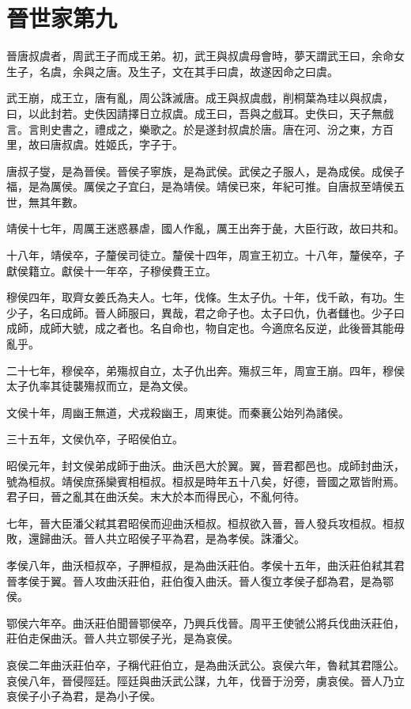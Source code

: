 \chapter{晉世家第九}

晉唐叔虞者，周武王子而成王弟。初，武王與叔虞母會時，夢天謂武王曰，余命女生子，名虞，余與之唐。及生子，文在其手曰虞，故遂因命之曰虞。

武王崩，成王立，唐有亂，周公誅滅唐。成王與叔虞戲，削桐葉為珪以與叔虞，曰，以此封若。史佚因請擇日立叔虞。成王曰，吾與之戲耳。史佚曰，天子無戲言。言則史書之，禮成之，樂歌之。於是遂封叔虞於唐。唐在河、汾之東，方百里，故曰唐叔虞。姓姬氏，字子于。

唐叔子燮，是為晉侯。晉侯子寧族，是為武侯。武侯之子服人，是為成侯。成侯子福，是為厲侯。厲侯之子宜臼，是為靖侯。靖侯已來，年紀可推。自唐叔至靖侯五世，無其年數。

靖侯十七年，周厲王迷惑暴虐，國人作亂，厲王出奔于彘，大臣行政，故曰共和。

十八年，靖侯卒，子釐侯司徒立。釐侯十四年，周宣王初立。十八年，釐侯卒，子獻侯籍立。獻侯十一年卒，子穆侯費王立。

穆侯四年，取齊女姜氏為夫人。七年，伐條。生太子仇。十年，伐千畝，有功。生少子，名曰成師。晉人師服曰，異哉，君之命子也。太子曰仇，仇者讎也。少子曰成師，成師大號，成之者也。名自命也，物自定也。今適庶名反逆，此後晉其能毋亂乎。

二十七年，穆侯卒，弟殤叔自立，太子仇出奔。殤叔三年，周宣王崩。四年，穆侯太子仇率其徒襲殤叔而立，是為文侯。

文侯十年，周幽王無道，犬戎殺幽王，周東徙。而秦襄公始列為諸侯。

三十五年，文侯仇卒，子昭侯伯立。

昭侯元年，封文侯弟成師于曲沃。曲沃邑大於翼。翼，晉君都邑也。成師封曲沃，號為桓叔。靖侯庶孫欒賓相桓叔。桓叔是時年五十八矣，好德，晉國之眾皆附焉。君子曰，晉之亂其在曲沃矣。末大於本而得民心，不亂何待。

七年，晉大臣潘父弒其君昭侯而迎曲沃桓叔。桓叔欲入晉，晉人發兵攻桓叔。桓叔敗，還歸曲沃。晉人共立昭侯子平為君，是為孝侯。誅潘父。

孝侯八年，曲沃桓叔卒，子胛桓叔，是為曲沃莊伯。孝侯十五年，曲沃莊伯弒其君晉孝侯于翼。晉人攻曲沃莊伯，莊伯復入曲沃。晉人復立孝侯子郄為君，是為鄂侯。

鄂侯六年卒。曲沃莊伯聞晉鄂侯卒，乃興兵伐晉。周平王使虢公將兵伐曲沃莊伯，莊伯走保曲沃。晉人共立鄂侯子光，是為哀侯。

哀侯二年曲沃莊伯卒，子稱代莊伯立，是為曲沃武公。哀侯六年，魯弒其君隱公。哀侯八年，晉侵陘廷。陘廷與曲沃武公謀，九年，伐晉于汾旁，虜哀侯。晉人乃立哀侯子小子為君，是為小子侯。

